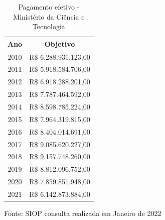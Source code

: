 \begin{table}[htpb]
\centering
  \caption{Pagamento efetivo - Ministério da Ciência e Tecnologia}
  \label{tab:orcamento}
  \begin{tabular}{cc}
    \hline
    \textbf{Ano} & \textbf{Objetivo}    \\
    \hline
    2010         & R\$ 6.288.931.123,00 \\
    2011         & R\$ 5.918.584.706,00 \\
    2012         & R\$ 6.918.288.201,00 \\
    2013         & R\$ 7.787.464.592,00 \\
    2014         & R\$ 8.598.785.224,00 \\
    2015         & R\$ 7.964.319.815,00 \\
    2016         & R\$ 8.404.014.691,00 \\
    2017         & R\$ 9.085.620.227,00 \\
    2018         & R\$ 9.157.748.260,00 \\
    2019         & R\$ 8.812.096.752,00 \\
    2020         & R\$ 7.859.851.948,00 \\
    2021         & R\$ 6.142.873.884,00
  \end{tabular}
  \centering
  \begin{tablenotes}
  \centering
    \small
    \item{Fonte: SIOP consulta realizada em Janeiro de 2022}
  \end{tablenotes}
\end{table}

